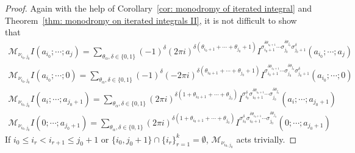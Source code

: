 \begin{proof}
Again with the help of Corollary~\ref{cor: monodromy of iterated integral} and Theorem~\ref{thm: monodromy on iterated integrals II}, it is not difficult to show that
\begin{equation}
\begin{aligned}
\mathcal M_{\nu_{i_0,j_0}}I(a_{i_0};\cdots;a_j)=\sum_{\theta_\alpha,\delta\in\{0,1\}}(-1)^\delta(2\pi i)^{\delta(\theta_{i_0+1}+\cdots+\theta_{j_0}+1)}I^{\sigma_{i_0+1}^{\delta\theta_{i_0+1}}\cdots\sigma_{j_0}^{\delta\theta_{j_0}}\sigma_{j_0+1}^\delta}(a_{i_0};\cdots;a_j)
\end{aligned}
\end{equation}
\begin{equation}
\begin{aligned}
\mathcal M_{\nu_{i_0,j_0}}I(a_{i_0};\cdots;0)=\sum_{\theta_\alpha,\delta\in\{0,1\}}(-1)^\delta(-2\pi i)^{\delta(\theta_{i_0+1}+\cdots+\theta_{j_0}+1)}I^{\sigma_{i_0+1}^{\delta\theta_{i_0+1}}\cdots\sigma_{j_0}^{\delta\theta_{j_0}}\sigma_{j_0+1}^\delta}(a_{i_0};\cdots;0)
\end{aligned}
\end{equation}
\begin{equation}
\begin{aligned}
\mathcal M_{\nu_{i_0,j_0}}I(a_i;\cdots;a_{j_0+1})=\sum_{\theta_\alpha,\delta\in\{0,1\}}(2\pi i)^{\delta(1+\theta_{i_0+1}+\cdots+\theta_{j_0})}I^{\sigma_{i_0}^\delta\sigma_{i_0+1}^{\delta\theta_{i_0+1}}\cdots\sigma_{j_0}^{\delta\theta_{j_0}}}(a_i;\cdots;a_{j_0+1})
\end{aligned}
\end{equation}
\begin{equation}
\begin{aligned}
\mathcal M_{\nu_{i_0,j_0}}I(0;\cdots;a_{j_0+1})=\sum_{\theta_\alpha,\delta\in\{0,1\}}(2\pi i)^{\delta(1+\theta_{i_0+1}+\cdots+\theta_{j_0})}I^{\sigma_{i_0}^\delta\sigma_{i_0+1}^{\delta\theta_{i_0+1}}\cdots\sigma_{j_0}^{\delta\theta_{j_0}}}(0;\cdots;a_{j_0+1})
\end{aligned}
\end{equation}
If $i_0\leq i_r<i_{r+1}\leq j_0+1$ or $\{i_0,j_0+1\}\cap\{i_r\}_{r=1}^k=\emptyset$, $\mathcal M_{\nu_{i_0,j_0}}$ acts trivially.


\end{proof}

